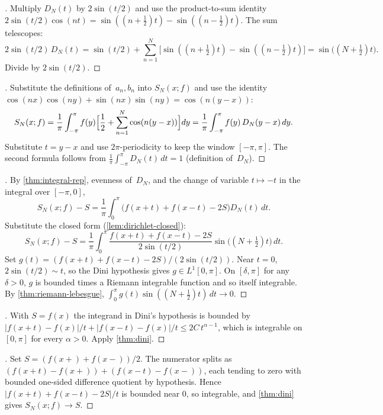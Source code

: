\begin{proof}[]
Multiply $D_N(t)$ by $2\sin(t/2)$ and use the
product-to-sum identity
$2 \sin(t/2) \cos(nt) = \sin((n + \tfrac12) t) - \sin((n - \tfrac12) t)$.
The sum telescopes:
\[
  2 \sin(t/2)\, D_N(t) = \sin(t/2) + \sum_{n=1}^{N}\bigl[\sin((n + \tfrac12)t) - \sin((n - \tfrac12) t)\bigr]
  = \sin\bigl((N + \tfrac12)t\bigr).
\]
Divide by $2\sin(t/2)$.
\end{proof}

\begin{proof}[]
Substitute the definitions of~$a_n, b_n$ into $S_N(x; f)$ and use the
identity $\cos(nx)\cos(ny) + \sin(nx)\sin(ny) = \cos(n(y - x))$:
\[
  S_N(x; f)
  = \frac{1}{\pi} \int_{-\pi}^{\pi} f(y) \Bigl[\frac{1}{2} + \sum_{n=1}^{N} \cos(n(y - x))\Bigr] dy
  = \frac{1}{\pi} \int_{-\pi}^{\pi} f(y)\, D_N(y - x)\, dy.
\]
Substitute $t = y - x$ and use $2\pi$-periodicity to keep the window
$[-\pi, \pi]$. The second formula follows from
$\frac{1}{\pi} \int_{-\pi}^{\pi} D_N(t)\, dt = 1$ (definition of~$D_N$).
\end{proof}

\begin{proof}[]
By \cref{thm:integral-rep}, evenness of~$D_N$, and the change
of variable $t \mapsto -t$ in the integral over $[-\pi, 0]$,
\[
  S_N(x; f) - S
  = \frac{1}{\pi} \int_{0}^{\pi} \bigl(f(x+t) + f(x-t) - 2S\bigr) D_N(t)\, dt.
\]
Substitute the closed form (\cref{lem:dirichlet-closed}):
\[
  S_N(x; f) - S
  = \frac{1}{\pi} \int_{0}^{\pi} \frac{f(x+t) + f(x-t) - 2S}{2\sin(t/2)} \sin\bigl((N + \tfrac12) t\bigr)\, dt.
\]
Set
$g(t) = (f(x+t) + f(x-t) - 2S)/(2\sin(t/2))$. Near $t = 0$,
$2\sin(t/2) \sim t$, so the Dini hypothesis gives $g \in L^1[0, \pi]$.
On $[\delta, \pi]$ for any $\delta > 0$, $g$ is bounded times a Riemann
integrable function and so itself integrable. By
\cref{thm:riemann-lebesgue},
$\int_0^{\pi} g(t) \sin((N + \tfrac12) t)\, dt \to 0$.
\end{proof}

\begin{proof}[]
With $S = f(x)$ the integrand in Dini's hypothesis is bounded by
$|f(x+t) - f(x)|/t + |f(x-t) - f(x)|/t \le 2C\, t^{\alpha - 1}$, which
is integrable on $[0, \pi]$ for every $\alpha > 0$. Apply
\cref{thm:dini}.
\end{proof}

\begin{proof}[]
Set $S = (f(x+) + f(x-))/2$. The numerator splits as
$(f(x+t) - f(x+)) + (f(x-t) - f(x-))$, each tending to zero with
bounded one-sided difference quotient by hypothesis. Hence
$|f(x+t) + f(x-t) - 2S|/t$ is bounded near $0$, so integrable, and
\cref{thm:dini} gives $S_N(x; f) \to S$.
\end{proof}

